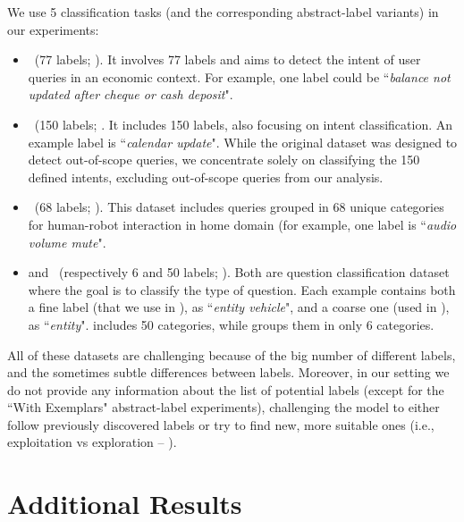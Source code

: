 We use 5 classification tasks (and the corresponding abstract-label variants) in our experiments:
\begin{itemize}
    \item \banking~(77 labels; \citet{Casanueva2020}). It involves 77 labels and aims to detect the intent of user queries in an economic context. For example, one label could be ``\textit{balance not updated after cheque or cash deposit}".
    \item \clinic~(150 labels; \citet{larson-etal-2019-evaluation}. It includes 150 labels, also focusing on intent classification. An example label is ``\textit{calendar update}". While the original dataset was designed to detect out-of-scope queries, we concentrate solely on classifying the 150 defined intents, excluding out-of-scope queries from our analysis.
    \item \nlu~(68 labels; \citet{Liu2021}). This dataset includes queries grouped in 68 unique categories for human-robot interaction in home domain (for example, one label is ``\textit{audio volume mute}".  
    \item \trec and \trecfine~(respectively 6 and 50 labels; \citet{li-roth-2002-learning, hovy-etal-2001-toward}). Both are question classification dataset where the goal is to classify the type of question. Each example contains both a fine label (that we use in \trecfine), as ``\textit{entity vehicle}", and a coarse one (used in \trec), as ``\textit{entity}". \trecfine includes 50 categories, while \trec groups them in only 6 categories.
\end{itemize}

All of these datasets are  challenging because of the big number of different labels, and the sometimes subtle differences between labels. Moreover, in our setting we do not provide any information about the list of potential labels (except for the ``With Exemplars" abstract-label experiments), challenging the model to either follow previously discovered labels or try to find new, more suitable ones (i.e., exploitation vs exploration -- \citet{sutton2018reinforcement}).


\section{Additional Results}\label{sec:appendix:results}

